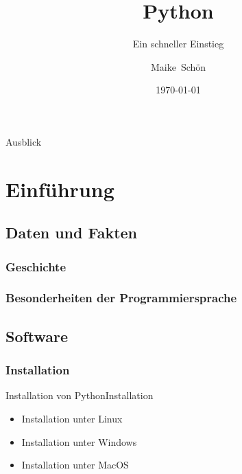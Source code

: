 \documentclass{beamer}
\title[Pythonkurs für Einsteiger] %
{Python}
\subtitle
{Ein schneller Einstieg} %
\author[Frühjahrskurs 2014 am RRZK] %
{Maike~Schön} %
\date[Short Occasion] %
{ \today }
\begin{document}
\begin{frame}
  \titlepage
\end{frame}

\begin{frame}{Ausblick}
  \tableofcontents
\end{frame}




\section{Einführung}

\subsection[Hintergrundwissen]{Daten und Fakten}
\subsubsection{Geschichte}
\subsubsection{Besonderheiten der Programmiersprache}
\subsubsection{}

\subsection[Installation von Python und weitere nützliche Software]{Software}
\subsubsection{Installation}

\begin{frame}{Installation von Python}{Installation}

  \begin{itemize}
  \item
    Installation unter Linux
  \item
    Installation unter Windows
  \item
    Installation unter MacOS
  \end{itemize}
\end{frame}
\end{document}
